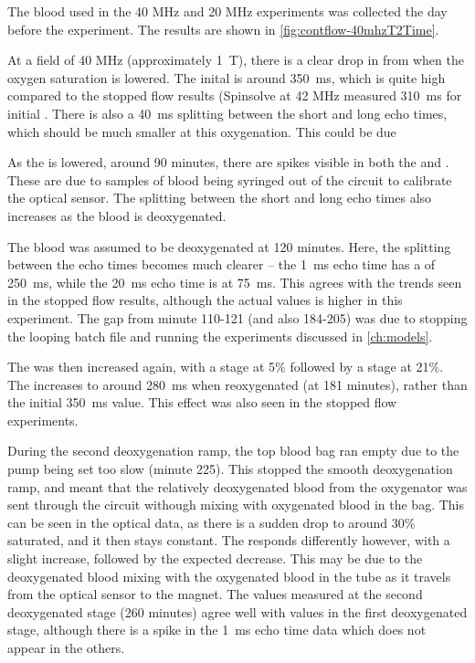 The blood used in the 40 MHz and 20 MHz experiments was collected the day before the experiment.
The results are shown in \autoref{fig:contflow-40mhzT2Time}.

At a field of 40 MHz (approximately \SI{1}{T}), there is a clear drop in \Ttwo from when the oxygen saturation is lowered.
The inital \Ttwo is around \SI{350}{ms}, which is quite high compared to the stopped flow results (Spinsolve at 42 MHz measured \SI{310}{ms} for initial \Ttwo.
There is also a \SI{40}{ms} splitting between the short and long echo times, which should be much smaller at this oxygenation.
This could be due

As the \SOtwo is lowered, around 90 minutes, there are spikes visible in both the \Ttwo and \SOtwo.
These are due to samples of blood being syringed out of the circuit to calibrate the optical sensor.
The splitting between the short and long echo times also increases as the blood is deoxygenated.

The blood was assumed to be deoxygenated at 120 minutes.
Here, the splitting between the echo times becomes much clearer -- the \SI{1}{ms} echo time has a \Ttwo of \SI{250}{ms}, while the \SI{20}{ms} echo time is at \SI{75}{ms}.
This agrees with the trends seen in the stopped flow results, although the actual \Ttwo values is higher in this experiment.
The gap from minute 110-121 (and also 184-205) was due to stopping the looping batch file and running the experiments discussed in \autoref{ch:models}.

The \SOtwo was then increased again, with a stage at 5\% \Otwo followed by a stage at 21\%.
The \Ttwo increases to around \SI{280}{ms} when reoxygenated (at 181 minutes), rather than the initial \SI{350}{ms} value.
This effect was also seen in the stopped flow experiments.

During the second deoxygenation ramp, the top blood bag ran empty due to the pump being set too slow (minute 225).
This stopped the smooth deoxygenation ramp, and meant that the relatively deoxygenated blood from the oxygenator was sent through the circuit withough mixing with oxygenated blood in the bag.
This can be seen in the optical data, as there is a sudden drop to around 30\% saturated, and it then stays constant.
The \Ttwo responds differently however, with a slight increase, followed by the expected decrease.
This may be due to the deoxygenated blood mixing with the oxygenated blood in the tube as it travels from the optical sensor to the magnet.
The \Ttwo values measured at the second deoxygenated stage (260 minutes) agree well with values in the first deoxygenated stage, although there is a spike in the \SI{1}{ms} echo time data which does not appear in the others.


